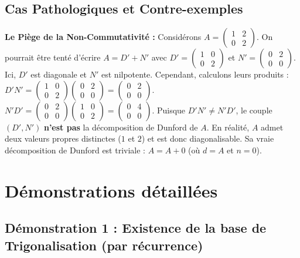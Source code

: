 \documentclass[11pt,a4paper]{article}
\begin{document}
\subsection{Cas Pathologiques et Contre-exemples}

\textbf{Le Piège de la Non-Commutativité :}
Considérons $A = \begin{pmatrix} 1 & 2 \\ 0 & 2 \end{pmatrix}$.
On pourrait être tenté d'écrire $A = D' + N'$ avec $D' = \begin{pmatrix} 1 & 0 \\ 0 & 2 \end{pmatrix}$ et $N' = \begin{pmatrix} 0 & 2 \\ 0 & 0 \end{pmatrix}$.
Ici, $D'$ est diagonale et $N'$ est nilpotente.
Cependant, calculons leurs produits :
$D'N' = \begin{pmatrix} 1 & 0 \\ 0 & 2 \end{pmatrix} \begin{pmatrix} 0 & 2 \\ 0 & 0 \end{pmatrix} = \begin{pmatrix} 0 & 2 \\ 0 & 0 \end{pmatrix}$.
$N'D' = \begin{pmatrix} 0 & 2 \\ 0 & 0 \end{pmatrix} \begin{pmatrix} 1 & 0 \\ 0 & 2 \end{pmatrix} = \begin{pmatrix} 0 & 4 \\ 0 & 0 \end{pmatrix}$.
Puisque $D'N' \neq N'D'$, le couple $(D', N')$ \textbf{n'est pas} la décomposition de Dunford de $A$.
En réalité, $A$ admet deux valeurs propres distinctes ($1$ et $2$) et est donc diagonalisable. Sa vraie décomposition de Dunford est triviale : $A = A + 0$ (où $d=A$ et $n=0$).

\section{Démonstrations détaillées}

\subsection{Démonstration 1 : Existence de la base de Trigonalisation (par récurrence)}
\end{document}
